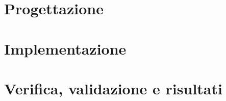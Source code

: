 \section{Progettazione}
\label{sec:progettazione}



\section{Implementazione}
\label{sec:implementazione}



\section{Verifica, validazione e risultati}
\label{sec:verifica-risultati}

